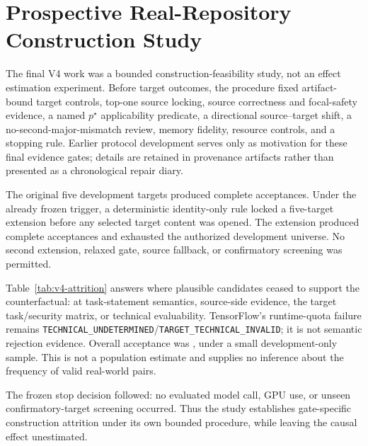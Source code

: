 \section{Prospective Real-Repository Construction Study}
\label{sec:real}

The final V4 work was a bounded construction-feasibility study, not an effect
estimation experiment.  Before target outcomes, the procedure fixed
artifact-bound target controls, top-one source locking, source correctness and
focal-safety evidence, a named \(p^\star\) applicability predicate, a
directional source--target shift, a no-second-major-mismatch review, memory
fidelity, resource controls, and a stopping rule.  Earlier protocol development
serves only as motivation for these final evidence gates; details are retained
in provenance artifacts rather than presented as a chronological repair diary.

The original five development targets produced
\VFourOriginalAcceptance{} complete acceptances.  Under the already frozen
trigger, a deterministic identity-only rule locked a five-target extension
before any selected target content was opened.  The extension produced
\VFourExtensionAcceptance{} complete acceptances and exhausted the authorized
development universe.  No second extension, relaxed gate, source fallback, or
confirmatory screening was permitted.



Table~\ref{tab:v4-attrition} answers where plausible candidates ceased to
support the counterfactual: at task-statement semantics, source-side evidence,
the target task/security matrix, or technical evaluability.  TensorFlow's
runtime-quota failure remains
\texttt{TECHNICAL\_UNDETERMINED}/\texttt{TARGET\_TECHNICAL\_INVALID}; it is not
semantic rejection evidence.  Overall acceptance was
\VFourTotalAcceptance{}, under a small development-only sample.  This is not a
population estimate and supplies no inference about the frequency of valid
real-world pairs.

The frozen stop decision followed: no evaluated model call, GPU use, or unseen
confirmatory-target screening occurred.  Thus the study establishes
gate-specific construction attrition under its own bounded procedure, while
leaving the causal effect unestimated.
